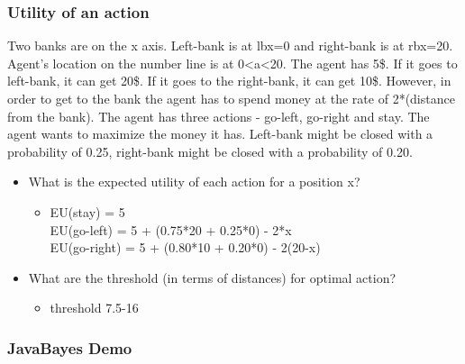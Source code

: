 \documentclass[compress, 9pt]{beamer}
\begin{document}
\begin{frame}
\frametitle{Utility of an action}
\label{sec-2}

Two banks are on the x axis. Left-bank is at lbx=0 and right-bank is
at rbx=20. Agent's location on the number line is at 0<a<20. The agent
has 5\$. If it goes to left-bank, it can get 20\$. If it goes to the
right-bank, it can get 10\$. However, in order to get to the bank the
agent has to spend money at the rate of 2*(distance from the
bank). The agent has three actions - go-left, go-right and stay. The
agent wants to maximize the money it has. Left-bank might be closed with a probability
of 0.25, right-bank might be closed with a probability of 0.20. 
\begin{itemize}

\item <1-> What is the expected utility of each action for a position x?
\label{sec-2-1}%
\begin{itemize}

\item <2-> EU(stay) = 5\\
\label{sec-2-1-1}%
EU(go-left) = 5 + (0.75*20 + 0.25*0) - 2*x\\
     EU(go-right) = 5 + (0.80*10 + 0.20*0) - 2(20-x)
\end{itemize} %

\item <3-> What are the threshold (in terms of distances) for optimal action?
\label{sec-2-2}%
\begin{itemize}

\item <4-> threshold 7.5-16
\label{sec-2-2-1}%
\end{itemize} %
\end{itemize} %
\end{frame}
\begin{frame}
\frametitle{JavaBayes Demo}
\label{sec-3}
\end{frame}
\end{document}
